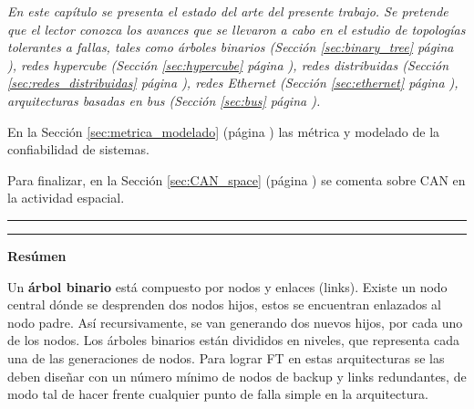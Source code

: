 \vspace{1cm}

\itshape
En este capítulo se presenta el estado del arte del presente trabajo. Se pretende que el lector
conozca los avances que se llevaron a cabo en el estudio de topologías tolerantes a fallas,
tales como árboles binarios (Sección \ref{sec:binary_tree} página \pageref{sec:binary_tree}),
redes hypercube (Sección \ref{sec:hypercube} página \pageref{sec:hypercube}), redes distribuidas
(Sección \ref{sec:redes_distribuidas} página \pageref{sec:redes_distribuidas}), redes Ethernet
(Sección \ref{sec:ethernet} página \pageref{sec:ethernet}), arquitecturas basadas en bus
(Sección \ref{sec:bus} página \pageref{sec:bus}).

En la Sección \ref{sec:metrica_modelado} (página \pageref{sec:metrica_modelado})
las métrica y modelado de la confiabilidad de sistemas.

Para finalizar, en la Sección \ref{sec:CAN_space} (página \pageref{sec:CAN_space}) se comenta sobre
CAN en la actividad espacial.
\upshape

\noindent\rule{\textwidth}{2pt}

\vspace{1cm}









\vspace{1cm}
\noindent\rule{\textwidth}{2pt}

\textbf{\Large{Resúmen}}

Un \textbf{árbol binario} está compuesto por nodos y enlaces (links). Existe un nodo central dónde se 
desprenden dos nodos hijos, estos se encuentran enlazados al nodo padre. Así recursivamente, se 
van generando dos nuevos hijos, por cada uno de los nodos. Los árboles binarios están divididos en 
niveles, que representa cada una de las generaciones de nodos. Para lograr \ac{FT} en estas arquitecturas se las deben diseñar con un número mínimo de nodos de backup y links redundantes, de modo tal de hacer frente cualquier punto de falla simple en la arquitectura.

